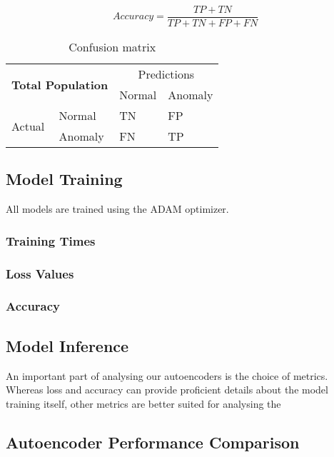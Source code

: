 \begin{equation}
    Accuracy = \frac{TP + TN}{TP + TN + FP + FN}
\end{equation}


\begin{table}[h]
\centering
\begin{tabular}{|ll|ll|}
\hline
\multicolumn{2}{|c|}{\multirow{2}{*}{\textbf{Total Population}}} & \multicolumn{2}{c|}{Predictions}      \\ \cline{3-4} 
\multicolumn{2}{|c|}{}                                           & \multicolumn{1}{l|}{Normal} & Anomaly \\ \hline
\multicolumn{1}{|l|}{\multirow{2}{*}{Actual}}      & Normal      & \multicolumn{1}{l|}{TN}     & FP      \\ \cline{2-4} 
\multicolumn{1}{|l|}{}                             & Anomaly     & \multicolumn{1}{l|}{FN}     & TP      \\ \hline
\end{tabular}
\label{tab:confmat}
\caption{Confusion matrix}
\end{table}


\subsection{Model Training}

All models are trained using the ADAM optimizer.


\subsubsection{Training Times}
\subsubsection{Loss Values}
\subsubsection{Accuracy}

\subsection{Model Inference}

An important part of analysing our autoencoders is the choice of metrics. Whereas loss and accuracy can provide proficient details about the model training itself, other metrics are better suited for analysing the 

\subsection{Autoencoder Performance Comparison}

